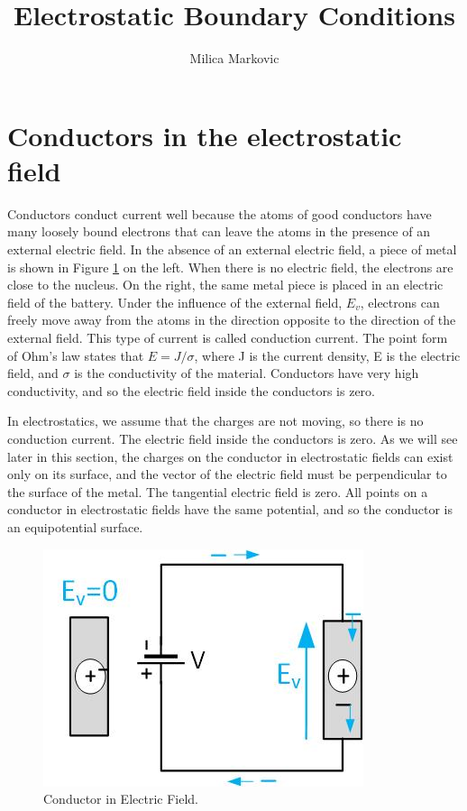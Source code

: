 \documentclass{ximera}
\title{Electrostatic Boundary Conditions}
\author{Milica Markovic}
\begin{document}
  
\begin{abstract}  

\end{abstract}  
\maketitle    

\section{Conductors in the electrostatic field}

Conductors conduct current well because the atoms of good conductors have many loosely bound electrons that can leave the atoms in the presence of an external electric field. In the absence of an external electric field, a piece of metal is shown in Figure \ref{fig:Conductor} on the left. When there is no electric field, the electrons are close to the nucleus. On the right, the same metal piece is placed in an electric field of the battery. Under the influence of the external field, $E_v$, electrons can freely move away from the atoms in the direction opposite to the direction of the external field. This type of current is called conduction current. The point form of Ohm's law states that $E=J/\sigma$, where J is the current density, E is the electric field, and $\sigma$ is the conductivity of the material. Conductors have very high conductivity, and so the electric field inside the conductors is zero.

In electrostatics, we assume that the charges are not moving, so there is no conduction current. The electric field inside the conductors is zero. As we will see later in this section, the charges on the conductor in electrostatic fields can exist only on its surface, and the vector of the electric field must be perpendicular to the surface of the metal. The tangential electric field is zero. All points on a conductor in electrostatic fields have the same potential, and so the conductor is an equipotential surface.

\begin{figure}[htbp]
\begin{center}
\includegraphics[scale=1]{../jpg/Conductor.jpg}
\end{center}
\caption{Conductor in  Electric Field.}
\label{fig:Conductor}
\end{figure}
\end{document}

